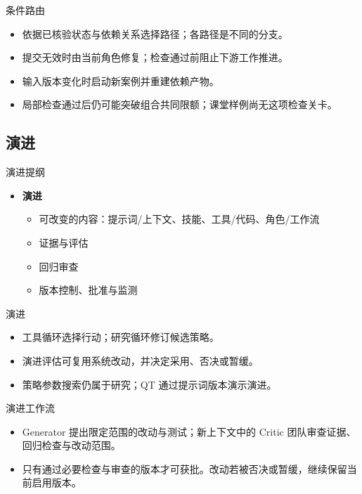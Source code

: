 \begin{frame}{条件路由}
\setlength{\topsep}{0pt}
\begin{center}\resizebox{.94\textwidth}{!}{}\end{center}
\begin{itemize}
\item 依据已核验状态与依赖关系选择路径；各路径是不同的分支。
\item 提交无效时由当前角色修复；检查通过前阻止下游工作推进。
\item 输入版本变化时启动新案例并重建依赖产物。
\item 局部检查通过后仍可能突破组合共同限额；课堂样例尚无这项检查关卡。
\end{itemize}
\end{frame}
\subsection{演进}
\begin{frame}{演进提纲}
\begin{itemize}
\item \textbf{演进}
\begin{itemize}
\item 可改变的内容：提示词/上下文、技能、工具/代码、角色/工作流
\item 证据与评估
\item 回归审查
\item 版本控制、批准与监测
\end{itemize}
\end{itemize}
\end{frame}
\begin{frame}{演进}
\begin{itemize}
\item 工具循环选择行动；研究循环修订候选策略。
\item 演进评估可复用系统改动，并决定采用、否决或暂缓。
\item 策略参数搜索仍属于研究；QT 通过提示词版本演示演进。
\end{itemize}
\end{frame}
\begin{frame}{演进工作流}
\setlength{\topsep}{0pt}
\begin{center}
\resizebox{.90\textwidth}{!}{}
\end{center}
\begin{itemize}
\item Generator 提出限定范围的改动与测试；新上下文中的 Critic 团队审查证据、回归检查与改动范围。
\item 只有通过必要检查与审查的版本才可获批。改动若被否决或暂缓，继续保留当前启用版本。
\end{itemize}
\end{frame}
